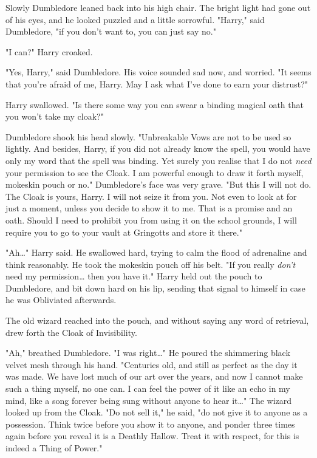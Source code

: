 Slowly Dumbledore leaned back into his high chair. The bright light had gone
out of his eyes, and he looked puzzled and a little sorrowful. "Harry," said
Dumbledore, "if you don't want to, you can just say no."

"I can?" Harry croaked.

"Yes, Harry," said Dumbledore. His voice sounded sad now, and worried. "It
seems that you're afraid of me, Harry. May I ask what I've done to earn your
distrust?"

Harry swallowed. "Is there some way you can swear a binding magical oath that
you won't take my cloak?"

Dumbledore shook his head slowly. "Unbreakable Vows are not to be used so
lightly. And besides, Harry, if you did not already know the spell, you would
have only my word that the spell was binding. Yet surely you realise that I do
not \emph{need} your permission to see the Cloak. I am powerful enough to draw
it forth myself, mokeskin pouch or no." Dumbledore's face was very grave. "But
this I will not do. The Cloak is yours, Harry. I will not seize it from you.
Not even to look at for just a moment, unless you decide to show it to me. That
is a promise and an oath. Should I need to prohibit you from using it on the
school grounds, I will require you to go to your vault at Gringotts and store
it there."

"Ah{\ldots}" Harry said. He swallowed hard, trying to calm the flood of
adrenaline and think reasonably. He took the mokeskin pouch off his belt. "If
you really \emph{don't} need my permission{\ldots} then you have it." Harry
held out the pouch to Dumbledore, and bit down hard on his lip, sending that
signal to himself in case he was Obliviated afterwards.

The old wizard reached into the pouch, and without saying any word of
retrieval, drew forth the Cloak of Invisibility.

"Ah," breathed Dumbledore. "I was right{\ldots}" He poured the shimmering black
velvet mesh through his hand. "Centuries old, and still as perfect as the day
it was made. We have lost much of our art over the years, and now I cannot make
such a thing myself, no one can. I can feel the power of it like an echo in my
mind, like a song forever being sung without anyone to hear it{\ldots}" The
wizard looked up from the Cloak. "Do not sell it," he said, "do not give it to
anyone as a possession. Think twice before you show it to anyone, and ponder
three times again before you reveal it is a Deathly Hallow. Treat it with
respect, for this is indeed a Thing of Power."

